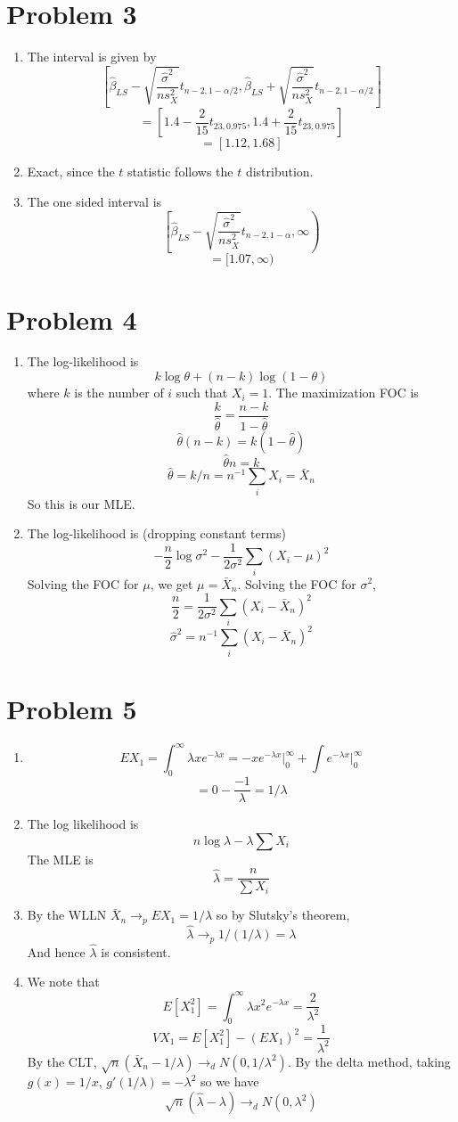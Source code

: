 \documentclass[10pt,letter]{article}
\begin{document}
\section*{Problem 3}
\begin{enumerate}[label=(\alph*)]
\item The interval is given by
\[ \left[ \hat{\beta}_{LS} - \sqrt{\frac{\hat{\sigma}^2}{n s^2_X}}t_{n-2,1-\alpha/2}, \hat{\beta}_{LS} + \sqrt{\frac{\hat{\sigma}^2}{n s^2_X}}t_{n-2,1-\alpha/2} \right] \]
\[ = \left[1.4 - \frac{2}{15}t_{23,0.975} , 1.4+\frac{2}{15}t_{23,0.975}\right] \]
\[ = [1.12, 1.68] \]
\item Exact, since the $t$ statistic follows the $t$ distribution.
\item The one sided interval is
\[ \left[ \hat{\beta}_{LS} - \sqrt{\frac{\hat{\sigma}^2}{n s^2_X}}t_{n-2,1-\alpha}, \infty \right) \]
\[ = [1.07, \infty) \]
\end{enumerate}
\section*{Problem 4}
\begin{enumerate}[label=(\alph*)]
\item The log-likelihood is
\[ k \log \theta + (n-k) \log (1-\theta) \]
where $k$ is the number of $i$ such that $X_i=1$.
The maximization FOC is
\[ \frac{k}{\hat{\theta}}  = \frac{n-k}{1-\hat{\theta}} \]
\[ \hat{\theta} (n-k) = k(1-\hat{\theta}) \]
\[ \hat{\theta} n = k \]
\[ \hat{\theta} = k/n = n^{-1} \sum_i X_i = \bar{X}_n \]
So this is our MLE.
\item The log-likelihood is (dropping constant terms)
\[ - \frac{n}{2}\log \sigma^2 - \frac{1}{2\sigma^2}\sum_i (X_i - \mu)^2 \]
Solving the FOC for $\mu$, we get $\mu = \bar{X}_n$. Solving the FOC for $\sigma^2$,
\[ \frac{n}{2} = \frac{1}{2\sigma^2} \sum_i (X_i - \bar{X}_n)^2 \]
\[ \hat{\sigma}^2 = n^{-1} \sum_i (X_i - \bar{X}_n)^2\]
\end{enumerate}
\section*{Problem 5}
\begin{enumerate}[label=(\alph*)]
\item
\[ EX_1 = \int_0^\infty \lambda x e^{-\lambda x} = -xe^{-\lambda x}\Bigr|_0^\infty + \int e^{-\lambda x} \Bigr|_0^\infty \]
\[ = 0 - \frac{-1}{\lambda} = 1/\lambda \]
\item The log likelihood is
\[ n \log \lambda - \lambda \sum X_i \]
The MLE is
\[ \hat{\lambda} = \frac{n}{\sum X_i} \]
\item By the WLLN $\bar{X}_n \to_p EX_1 = 1/\lambda$ so by Slutsky's theorem,
\[ \hat{\lambda} \to_p 1/(1/\lambda) = \lambda \]
And hence $\hat{\lambda}$ is consistent.
\item We note that
\[ E[X_1^2] = \int_0^\infty \lambda x^2 e^{-\lambda x} = \frac{2}{\lambda^2}  \]
\[ VX_1 = E[X_1^2] - (EX_1)^2 = \frac{1}{\lambda^2} \]
By the CLT, $\sqrt{n} (\bar{X}_n - 1/\lambda) \to_d N(0, 1/\lambda^2)$. By the delta method, taking $g(x) = 1/x$, $g'(1/\lambda) = -\lambda^2$ so we have
\[ \sqrt{n} (\hat{\lambda} - \lambda) \to_d N(0, \lambda^2) \]
\end{enumerate}
\end{document}
